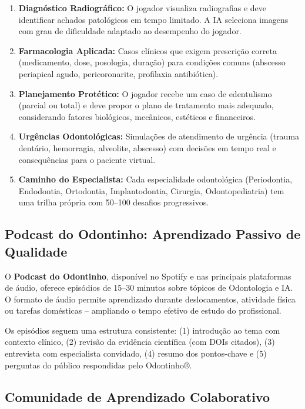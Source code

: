 \begin{enumerate}
  \item \textbf{Diagnóstico Radiográfico:} O jogador visualiza radiografias e
    deve identificar achados patológicos em tempo limitado. A IA seleciona
    imagens com grau de dificuldade adaptado ao desempenho do jogador.

  \item \textbf{Farmacologia Aplicada:} Casos clínicos que exigem prescrição
    correta (medicamento, dose, posologia, duração) para condições comuns
    (abscesso periapical agudo, pericoronarite, profilaxia antibiótica).

  \item \textbf{Planejamento Protético:} O jogador recebe um caso de edentulismo
    (parcial ou total) e deve propor o plano de tratamento mais adequado,
    considerando fatores biológicos, mecânicos, estéticos e financeiros.

  \item \textbf{Urgências Odontológicas:} Simulações de atendimento de urgência
    (trauma dentário, hemorragia, alveolite, abscesso) com decisões em tempo
    real e consequências para o paciente virtual.

  \item \textbf{Caminho do Especialista:} Cada especialidade odontológica
    (Periodontia, Endodontia, Ortodontia, Implantodontia, Cirurgia,
    Odontopediatria) tem uma trilha própria com 50--100 desafios progressivos.
\end{enumerate}

\subsection{Podcast do Odontinho: Aprendizado Passivo de Qualidade}

O \textbf{Podcast do Odontinho}, disponível no Spotify e nas principais
plataformas de áudio, oferece episódios de 15--30 minutos sobre tópicos de
Odontologia e IA. O formato de áudio permite aprendizado durante deslocamentos,
atividade física ou tarefas domésticas -- ampliando o tempo efetivo de estudo do
profissional.

Os episódios seguem uma estrutura consistente: (1) introdução ao tema com
contexto clínico, (2) revisão da evidência científica (com DOIs citados),
(3) entrevista com especialista convidado, (4) resumo dos pontos-chave e
(5) perguntas do público respondidas pelo Odontinho®.

\subsection{Comunidade de Aprendizado Colaborativo}

